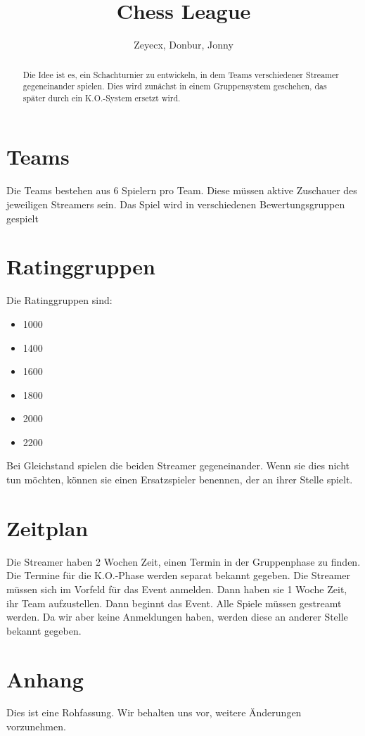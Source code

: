 \documentclass[preprint,12pt]{elsarticle}
\begin{document}
	
\begin{frontmatter}
		
		
\title{Chess League}
		
\author{Zeyecx, Donbur, Jonny}
		
\address{German Paper}
	 
\begin{abstract}
	Die Idee ist es, ein Schachturnier zu entwickeln, in dem Teams verschiedener Streamer gegeneinander spielen.
	Dies wird zunächst in einem Gruppensystem geschehen, das später durch ein K.O.-System ersetzt wird. 
\end{abstract}
\end{frontmatter}
\linenumbers
\section{Teams}
Die Teams bestehen aus 6 Spielern pro Team. Diese müssen aktive Zuschauer des jeweiligen Streamers sein. 
Das Spiel wird in verschiedenen Bewertungsgruppen gespielt

\section{Ratinggruppen}

Die Ratinggruppen sind:
\begin{itemize}
	\item 1000
	\item 1400 
	\item 1600
	\item 1800
	\item 2000
	\item 2200
\end{itemize}
Bei Gleichstand spielen die beiden Streamer gegeneinander. Wenn sie dies nicht tun möchten, können sie einen Ersatzspieler benennen, der an ihrer Stelle spielt.

\section{Zeitplan}
Die Streamer haben 2 Wochen Zeit, einen Termin in der Gruppenphase zu finden. Die Termine für die K.O.-Phase werden separat bekannt gegeben.
Die Streamer müssen sich im Vorfeld für das Event anmelden. Dann haben sie 1 Woche Zeit, ihr Team aufzustellen.
Dann beginnt das Event.
Alle Spiele müssen gestreamt werden.
Da wir aber keine Anmeldungen haben, werden diese an anderer Stelle bekannt gegeben.

\section{Anhang}
Dies ist eine Rohfassung. Wir behalten uns vor, weitere Änderungen vorzunehmen.


\linenumbers


	

	
\end{document}
